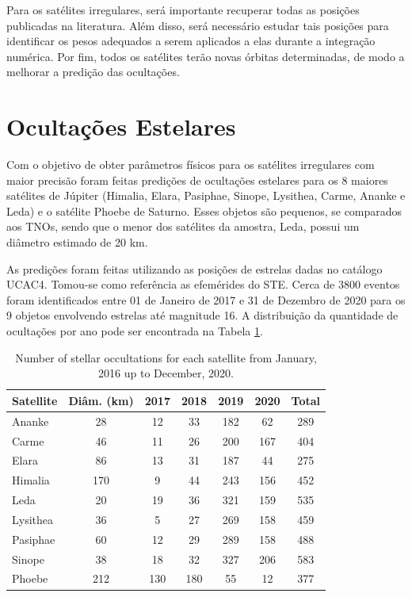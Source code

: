 \documentclass[12pt,a4paper]{report}
\begin{document}
Para os satélites irregulares, será importante recuperar todas as posições publicadas na literatura. Além disso, será necessário estudar tais posições para identificar os pesos adequados a serem aplicados a elas durante a integração numérica. Por fim, todos os satélites terão novas órbitas determinadas, de modo a melhorar a predição das ocultações.

\section{Ocultações Estelares} \label{Sec:Occ}

\indent \indent Com o objetivo de obter parâmetros físicos para os satélites irregulares com maior precisão foram feitas predições de ocultações estelares para os 8 maiores satélites de Júpiter (Himalia, Elara, Pasiphae, Sinope, Lysithea, Carme, Ananke e Leda) e o satélite Phoebe de Saturno. Esses objetos são pequenos, se comparados aos TNOs, sendo que o menor dos satélites da amostra, Leda, possui um diâmetro estimado de 20 km.

As predições foram feitas utilizando as posições de estrelas dadas no catálogo UCAC4. Tomou-se como referência as efemérides do STE. Cerca de 3800 eventos foram identificados entre 01 de Janeiro de 2017 e 31 de Dezembro de 2020 para os 9 objetos envolvendo estrelas até magnitude 16. A distribuição da quantidade de ocultações por ano pode ser encontrada na Tabela \ref{Tab: satellite-occultation}.

\begin{table}[h]
\caption{\label{Tab: satellite-occultation} Number of stellar occultations for each satellite from January, 2016 up to December, 2020.}
\begin{centering}
\begin{tabular}{lcccccc}
\hline  \hline
Satellite & Diâm. (km) & 2017 & 2018 & 2019 & 2020 & Total \tabularnewline
\hline
Ananke & 28 & 12 & 33 & 182 & 62 & 289 \tabularnewline
Carme & 46 & 11 & 26 & 200 & 167 & 404 \tabularnewline
Elara & 86 & 13 & 31 & 187 & 44 & 275 \tabularnewline
Himalia & 170 & 9 & 44 & 243 & 156 & 452 \tabularnewline
Leda & 20 & 19 & 36 & 321 & 159 & 535 \tabularnewline
Lysithea & 36 & 5 & 27 & 269 & 158 & 459 \tabularnewline
Pasiphae & 60 & 12 & 29 & 289 & 158 & 488 \tabularnewline
Sinope & 38 & 18 & 32 & 327 & 206 & 583 \tabularnewline
\hdashline
Phoebe & 212 & 130 & 180 & 55 & 12 & 377 \tabularnewline
\hline
\end{tabular}
\par \end{centering}
\end{table}
\end{document}
